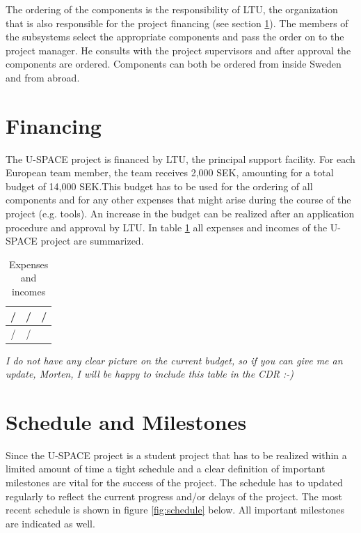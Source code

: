 The ordering of the components is the responsibility of \ac{LTU}, the organization that is also responsible for the project financing (see section \ref{sec:financing}). The members of the subsystems select the appropriate components and pass the order on to the project manager. He consults with the project supervisors and after approval the components are ordered. Components can both be ordered from inside Sweden and from abroad.

\section{Financing}
\label{sec:financing}

The \ac{U-SPACE} project is financed by \ac{LTU}, the principal support facility. For each European team member, the team receives 2,000 SEK, amounting for a total budget of 14,000 SEK.This budget has to be used for the ordering of all components and for any other expenses that might arise during the course of the project (e.g. tools). An increase in the budget can be realized after an application procedure and approval by \ac{LTU}. In table \ref{tab:financing} all expenses and incomes of the \ac{U-SPACE} project are summarized.

\begin{table}[H]
\centering
\caption{Expenses and incomes}
\label{tab:financing}
\begin{tabular}{c c c}
\hline
\textbf{/} & \textbf{/} & \textbf{/}\\ \hline
/ & / &\\
\hline
\end{tabular}
\end{table}

\textit{I do not have any clear picture on the current budget, so if you can give me an update, Morten, I will be happy to include this table in the CDR :-)}

\section{Schedule and Milestones}

Since the \ac{U-SPACE} project is a student project that has to be realized within a limited amount of time a tight schedule and a clear definition of important milestones are vital for the success of the project. The schedule has to updated regularly to reflect the current progress and/or delays of the project. The most recent schedule is shown in figure \ref{fig:schedule} below. All important milestones are indicated as well.

